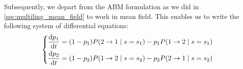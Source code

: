 \documentclass[../thesis.tex]{subfiles}
\begin{document}
Subsequently, we depart from the \ac{ABM} formulation as we did in
\cref{sec:multiling_mean_field} to work in mean field. This enables us to write the
following system of differential equations:
\begin{equation}
    \label{eq:ses_ling_time_evol}
    \left\{
    \begin{aligned}
        \dv{p_1}{t} 
            &= (1 - p_1) P(2 \rightarrow 1 \mid s = s_1)
                - p_1 P(1 \rightarrow 2 \mid s = s_1)
        \\
        \dv{p_2}{t} 
            &= (1 - p_2) P(1 \rightarrow 2 \mid s = s_2)
                 - p_2 P(2 \rightarrow 1 \mid s = s_2)
    \end{aligned}
    \right.
\end{equation}
\end{document}
